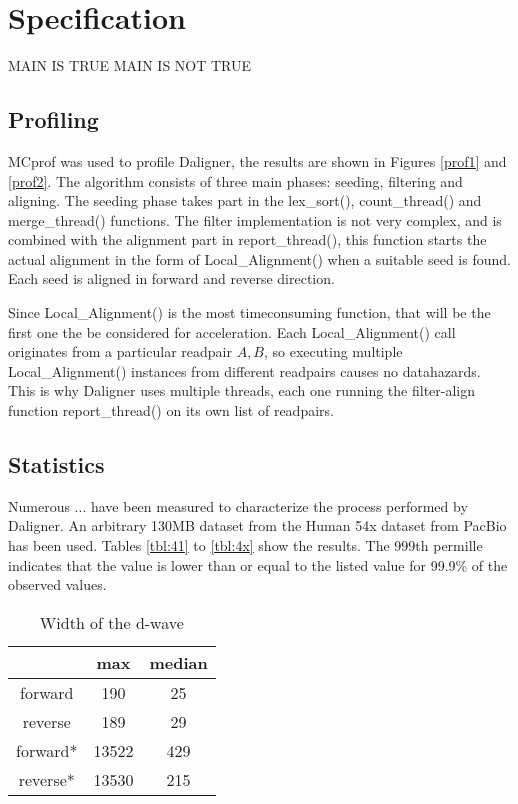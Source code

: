 \documentclass[../main/thesis.tex]{subfiles}
\begin{document}
\chapter{Specification}
\ifdefined\main
\acresetall
MAIN IS TRUE
\newcommand{\codePath}{../4_specification/code/}
\newcommand{\figPath}{../4_specification/figures/}
\else
MAIN IS NOT TRUE

\fi

\section{Profiling}

MCprof \cite{mcprof1}\cite{mcprof2} was used to profile Daligner, the results are shown in Figures \ref{prof1} and \ref{prof2}.
The algorithm consists of three main phases: seeding, filtering and aligning.
The seeding phase takes part in the lex\_sort(), count\_thread() and merge\_thread() functions.
The filter implementation is not very complex, and is combined with the alignment part in report\_thread(), this function starts the actual alignment in the form of Local\_Alignment() when a suitable seed is found.
Each seed is aligned in forward and reverse direction.




Since Local\_Alignment() is the most timeconsuming function, that will be the first one the be considered for acceleration.
Each Local\_Alignment() call originates from a particular readpair $A, B$, so executing multiple Local\_Alignment() instances from different readpairs causes no datahazards.
This is why Daligner uses multiple threads, each one running the filter-align function report\_thread() on its own list of readpairs.


\section{Statistics}
Numerous ... have been measured to characterize the process performed by Daligner.
An arbitrary 130MB dataset from the Human 54x dataset from PacBio has been used.
Tables \ref{tbl:41} to \ref{tbl:4x} show the results.
The 999th permille indicates that the value is lower than or equal to the listed value for 99.9\% of the observed values.

\begin{table}[h]
\caption{Width of the d-wave}
\centering
\vspace{-5pt}
\begin{tabular}{c|c c}
& max & median \\ \hline
forward & 190 & 25 \\
reverse & 189 & 29 \\ \hline
forward* & 13522 & 429 \\
reverse* & 13530 & 215 \\
\end{tabular}
\end{table}
\end{document}
